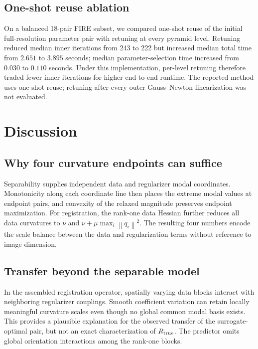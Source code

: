 \documentclass[pdflatex,iicol,sn-mathphys-num]{sn-jnl}
\theoremstyle{definition}
\newcommand{\norm}[1]{\left\lVert #1\right\rVert}
\begin{document}
\subsection{One-shot reuse ablation}
On a balanced 18-pair FIRE subset, we compared one-shot reuse of the initial
full-resolution parameter pair with retuning at every pyramid level. Retuning
reduced median inner iterations from 243 to 222 but increased median total time
from $2.651$ to $3.895$ seconds; median parameter-selection time increased from
$0.030$ to $0.110$ seconds. Under this implementation, per-level retuning
therefore traded fewer inner iterations for higher end-to-end runtime. The
reported method uses one-shot reuse; retuning after every outer
Gauss--Newton linearization was not evaluated.

\section{Discussion}\label{sec:discussion}
\subsection{Why four curvature endpoints can suffice}
Separability supplies independent data and regularizer modal coordinates.
Monotonicity along each coordinate line then places the extreme modal values
at endpoint pairs, and convexity of the relaxed magnitude preserves endpoint
maximization.
For registration, the rank-one data Hessian further reduces all data
curvatures to $\nu$ and
$\nu+\mu\max_i\norm{q_i}^2$. The resulting four numbers encode the scale
balance between the data and regularization terms without reference to image
dimension.

\subsection{Transfer beyond the separable model}
In the assembled registration operator, spatially varying data blocks interact
with neighboring regularizer couplings. Smooth coefficient variation can
retain locally meaningful curvature scales even though no global common modal
basis exists. This provides a plausible explanation for the observed transfer
of the surrogate-optimal pair, but not an exact characterization of
$R_{\rm true}$. The predictor omits global orientation interactions among the
rank-one blocks.
\end{document}
